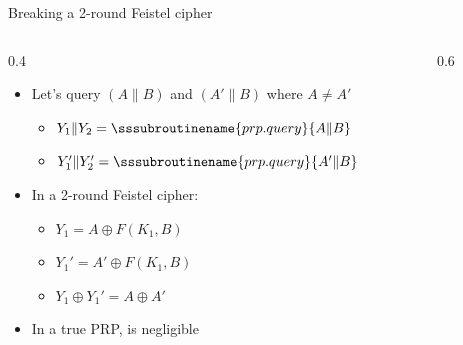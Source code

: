 \documentclass[aspectratio=169, lualatex, handout]{beamer}
\begin{document}
\begin{frame}{Breaking a 2-round Feistel cipher}
	\begin{columns}[c]
		\begin{column}{0.4\textwidth}
			\begin{itemize}[<+->]
				\item Let's query $(A \| B)$ and $(A' \| B)$ where $A \neq A'$
				      \begin{itemize}
					      \item $Y_1 \| Y_2 = \sssubroutinename{prp.query}{A \| B}$
					      \item $Y_1' \| Y_2' = \sssubroutinename{prp.query}{A' \| B}$
				      \end{itemize}
				\item In a 2-round Feistel cipher:
				      \begin{itemize}
					      \item $Y_1 = A \oplus F(K_1, B)$
					      \item $Y_1' = A' \oplus F(K_1, B)$
					      \item $Y_1 \oplus Y_1' = A \oplus A'$
				      \end{itemize}
				\item In a true PRP,  is negligible
			\end{itemize}
		\end{column}
		\begin{column}{0.6\textwidth}
			\begin{center}
			\end{center}
		\end{column}
	\end{columns}
\end{frame}
\end{document}
